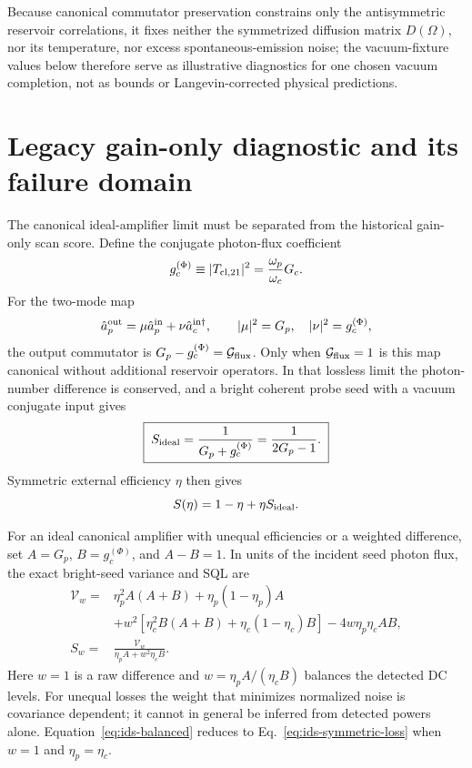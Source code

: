 \documentclass[11pt,a4paper]{article}
\begin{document}
Because canonical commutator preservation constrains only the antisymmetric
reservoir correlations, it fixes neither the symmetrized diffusion matrix
$D(\Omega)$, nor its temperature, nor excess spontaneous-emission noise; the
vacuum-fixture values below therefore serve as illustrative diagnostics for one
chosen vacuum completion, not as bounds or Langevin-corrected physical
predictions.

\section{Legacy gain-only diagnostic and its failure domain}
\label{sec:gain-referred-ids}

The canonical ideal-amplifier limit must be separated from the historical
gain-only scan score. Define the conjugate photon-flux coefficient
\begin{equation}
g_c^{(\Phi)}\equiv |T_{{\rm cl},21}|^2
=\frac{\omega_p}{\omega_c}G_c .
\label{eq:conjugate-flux-gain}
\end{equation}
For the two-mode map
\[
\hat a_p^{\rm out}=\mu\hat a_p^{\rm in}
+\nu\hat a_c^{{\rm in}\dagger},\qquad
|\mu|^2=G_p,\quad |\nu|^2=g_c^{(\Phi)},
\]
the output commutator is
$G_p-g_c^{(\Phi)}=\mathcal G_{\rm flux}$. Only when
$\mathcal G_{\rm flux}=1$ is this map canonical without additional reservoir
operators. In that lossless limit the photon-number difference is conserved,
and a bright coherent probe seed with a vacuum conjugate input gives
\begin{equation}
\boxed{\;
S_{\rm ideal}=\frac{1}{G_p+g_c^{(\Phi)}}
=\frac{1}{2G_p-1}.\;}
\label{eq:ids-ideal}
\end{equation}
Symmetric external efficiency $\eta$ then gives
\begin{equation}
S(\eta)=1-\eta+\eta S_{\rm ideal}.
\label{eq:ids-symmetric-loss}
\end{equation}

For an ideal canonical amplifier with unequal efficiencies or a weighted
difference, set $A=G_p$, $B=g_c^{(\Phi)}$, and $A-B=1$. In units of the incident
seed photon flux, the exact bright-seed variance and SQL are
\begin{align}
\mathcal V_w={}&\eta_p^2A(A+B)+\eta_p(1-\eta_p)A\nonumber\\
&+w^2\!\left[\eta_c^2B(A+B)+\eta_c(1-\eta_c)B\right]
-4w\eta_p\eta_cAB,\\
S_w={}&\frac{\mathcal V_w}{\eta_pA+w^2\eta_cB} .
\label{eq:ids-balanced}
\end{align}
Here $w=1$ is a raw difference and $w=\eta_pA/(\eta_cB)$ balances the detected
DC levels. For unequal losses the weight that minimizes normalized noise is
covariance dependent; it cannot in general be inferred from detected powers
alone. Equation~\eqref{eq:ids-balanced} reduces to
Eq.~\eqref{eq:ids-symmetric-loss} when $w=1$ and
$\eta_p=\eta_c$.
\end{document}
